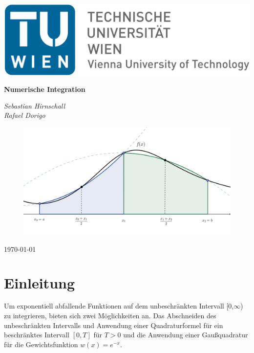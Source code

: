 \documentclass[12pt,a4paper]{scrartcl}
\author{Sebastian Hirnschall}
\date{\today}
\numberwithin{equation}{section}
\numberwithin{myalgctr}{section}
\numberwithin{mytheoremctr}{subsection}
\numberwithin{mykorollarctr}{subsection}
\numberwithin{mylemmactr}{subsection}
\numberwithin{mybeispielctr}{subsection}
\begin{document}
	\begin{titlepage}
		\begin{flushleft}
				\includegraphics[width=.4\linewidth]{tuwien.png}
		\end{flushleft}	
		\centering
		
		
		\vspace{5cm}
		{\huge\bfseries Numerische Integration\par}
		\vspace{2cm}
		{\Large\itshape Sebastian Hirnschall\\Rafael Dorigo\par}
		\vspace{2cm}
		\begin{figure}[!h]
			\vspace{0cm}
			\centering
			\includegraphics[width=.6\linewidth]{./titlepage.png}
		\end{figure}
		
		\vfill
		
		{\large \today\par}
	\end{titlepage}
	\restoregeometry
	
	\thispagestyle{firststyle}
	
	\newpage
	
	
	\tableofcontents
	\thispagestyle{general}
	\newpage

	\section{Einleitung}
	Um exponentiell abfallende Funktionen auf dem unbeschränkten Intervall [0,$\infty$) zu integrieren, bieten sich zwei Möglichkeiten an. Das Abschneiden des unbeschränkten Intervalls und Anwendung einer Quadraturformel für ein beschränktes Intervall $[0,T]$ für $T > 0$ und die Anwendung einer Gaußquadratur für die Gewichtsfunktion $w(x) = e^{-x}$.
	
\end{document}
